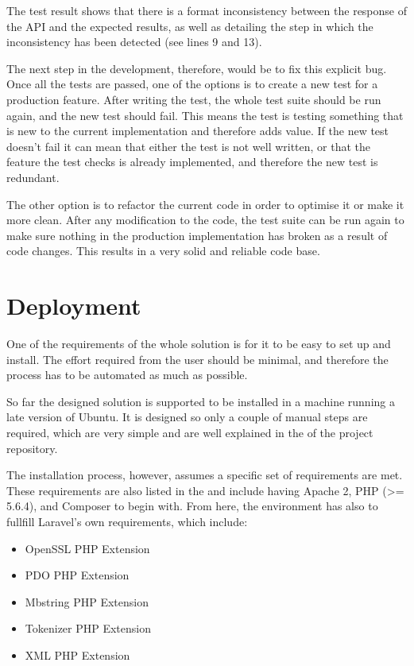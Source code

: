 The test result shows that there is a format inconsistency between the response of the API and the expected results, as well as detailing the step in which the inconsistency has been detected (see lines 9 and 13).

The next step in the development, therefore, would be to fix this explicit bug. Once all the tests are passed, one of the options is to create a new test for a production feature. After writing the test, the whole test suite should be run again, and the new test should fail. This means the test is testing something that is new to the current implementation and therefore adds value. If the new test doesn’t fail it can mean that either the test is not well written, or that the feature the test checks is already implemented, and therefore the new test is redundant.

The other option is to refactor the current code in order to optimise it or make it more clean. After any modification to the code, the test suite can be run again to make sure nothing in the production implementation has broken as a result of code changes. This results in a very solid and reliable code base.

\section{Deployment}
One of the requirements of the whole solution is for it to be easy to set up and install. The effort required from the user should be minimal, and therefore the process has to be automated as much as possible.

So far the designed solution is supported to be installed in a machine running a late version of Ubuntu. It is designed so only a couple of manual steps are required, which are very simple and are well explained in the  of the project repository.

The installation process, however, assumes a specific set of requirements are met. These requirements are also listed in the  and include having Apache 2, PHP (\textgreater= 5.6.4), and Composer to begin with. From here, the environment has also to fullfill Laravel's own requirements, which include:

\begin{itemize}
\item OpenSSL PHP Extension
\item PDO PHP Extension
\item Mbstring PHP Extension
\item Tokenizer PHP Extension
\item XML PHP Extension
\end{itemize}


